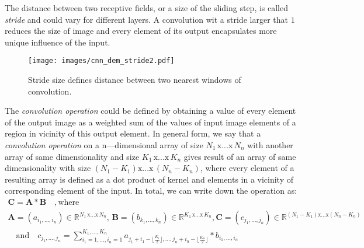 The distance between two receptive fields, or a size of the sliding step,  is called \textit{stride} and could vary for different layers.
A convolution wit a stride larger that $1$ reduces the size of image and every element of its output encapsulates more unique influence of the input. 
\begin{figure}
	\centering
	\texttt{[image: images/cnn\_dem\_stride2.pdf]}
	\caption{Stride size defines distance between two nearest windows of convolution.}
	\label{fig:stride_demo}
	\end{figure}
\medskip

The \textit{convolution operation} could be defined by obtaining a value of every element of the output image as a weighted sum of the values of input image elements of a region in vicinity of this output element.
In general form, we say that a \textit{convolution operation} on a $\mathrm{n}$—dimensional array of size $N_{1} \, \mathrm{x}... \mathrm{x} \, N_{n}$ with another array of same dimensionality and size $K_{1} \, \mathrm{x}... \mathrm{x} \, K_{n} $ gives result of an array of same dimensionality with size $ (N_{1}-K_{1}) \mathrm{x}... \mathrm{x} \, (N_{n}-K_{n}) $, 
where every element of a resulting array is defined as a dot product of kernel and elements in a vicinity of corresponding element of the input.
In total, we can write down the operation as:
\begin{gather*}
\mathbf{C} = \mathbf{A} \ast \mathbf{B} \quad , \mathrm{where} \quad \\ \mathbf{A} = (a_{i_{1},...,i_{n}}) \in \mathbb{R}^{N_{1} \, \mathrm{x}... \mathrm{x} \, N_{n}} , \, \mathbf{B} = (b_{k_{1},...,k_{n}}) \in \mathbb{R}^{K_{1} \, \mathrm{x}... \mathrm{x} \, K_{n}},
\mathbf{C} = (c_{j_{1},...,j_{n}}) \in \mathbb{R}^{(N_{1}-K_{1}) \mathrm{x}... \mathrm{x} (N_{n}-K_{n})} \\ \quad \mathrm{and}
\quad c_{j_{1},...,j_{n}} = \sum_{i_{1}=1,...,i_{n}=1}^{K_{1},...,K_{n}} a_{j_{1}+i_{1}-\lfloor \frac{K_{i}}{2}\rfloor,...,j_{n}+i_{n}-\lfloor \frac{K_{n}}{2}\rfloor} \ast b_{i_{1},...,i_{n}}
\end{gather*}

